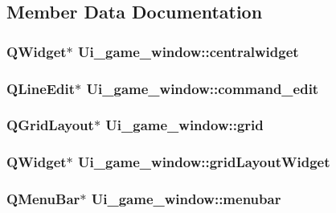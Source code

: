 \subsection{Member Data Documentation}
\hypertarget{classUi__game__window_aa46a61bfcdb8c9d7706974913e944cbe}{
\subsubsection[{centralwidget}]{\setlength{\rightskip}{0pt plus 5cm}Q\-Widget$\ast$ Ui\-\_\-game\-\_\-window\-::centralwidget}}\label{classUi__game__window_aa46a61bfcdb8c9d7706974913e944cbe}
\hypertarget{classUi__game__window_a0881fadd6d3e567683404dd2aea66dd8}{
\subsubsection[{command\-\_\-edit}]{\setlength{\rightskip}{0pt plus 5cm}Q\-Line\-Edit$\ast$ Ui\-\_\-game\-\_\-window\-::command\-\_\-edit}}\label{classUi__game__window_a0881fadd6d3e567683404dd2aea66dd8}
\hypertarget{classUi__game__window_af41420b2a865afe1600e82c56b788b86}{
\subsubsection[{grid}]{\setlength{\rightskip}{0pt plus 5cm}Q\-Grid\-Layout$\ast$ Ui\-\_\-game\-\_\-window\-::grid}}\label{classUi__game__window_af41420b2a865afe1600e82c56b788b86}
\hypertarget{classUi__game__window_a8447a074aadb12177aba7e7e1ba8cb61}{
\subsubsection[{grid\-Layout\-Widget}]{\setlength{\rightskip}{0pt plus 5cm}Q\-Widget$\ast$ Ui\-\_\-game\-\_\-window\-::grid\-Layout\-Widget}}\label{classUi__game__window_a8447a074aadb12177aba7e7e1ba8cb61}
\hypertarget{classUi__game__window_a264dfe7db0e67d4a69d2d21ede691982}{
\subsubsection[{menubar}]{\setlength{\rightskip}{0pt plus 5cm}Q\-Menu\-Bar$\ast$ Ui\-\_\-game\-\_\-window\-::menubar}}\label{classUi__game__window_a264dfe7db0e67d4a69d2d21ede691982}
